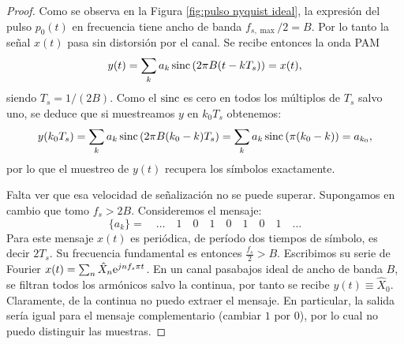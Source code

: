\begin{proof}
Como se observa en la Figura \ref{fig:pulso nyquist ideal}, la expresión del pulso $p_0(t)$ en frecuencia tiene ancho de banda $f_{s,\max}/2 = B$. Por lo tanto la señal $x(t)$ pasa sin distorsión por el canal. Se recibe entonces la onda PAM
\begin{equation*}
  y(t) = \sum_k a_k \operatorname{sinc} \left(2\pi B (t-kT_s)\right) = x(t),
\end{equation*}
siendo $T_s=1/(2B)$.
Como el $\operatorname{sinc}$ es cero en todos los múltiplos de $T_s$ salvo uno, se deduce que si muestreamos $y$ en $k_0 T_s$ obtenemos:
\begin{equation*}
y(k_0 T_s) = \sum_k a_k \operatorname{sinc}\left(2\pi B (k_0-k)T_s\right) = \sum_k a_k \operatorname{sinc}\left(\pi(k_0-k)\right) = a_{k_0},
\end{equation*}
por lo que el muestreo de $y(t)$ recupera los símbolos exactamente.

Falta ver que esa velocidad de señalización no se puede superar. Supongamos en cambio que tomo $f_s > 2B$. Consideremos el mensaje:
\begin{equation*}
\{a_k\} = \quad \ldots \quad 1 \quad 0 \quad 1 \quad 0 \quad 1\quad 0 \quad 1\quad \ldots
\end{equation*}
Para este mensaje $x(t)$ es periódica, de período dos tiempos de símbolo, es decir $2T_s$. Su frecuencia fundamental es entonces $\frac{f_s}{2} > B$. Escribimos su serie de Fourier  $x(t) = \sum_n \hat{X}_n\mathrm{e}^{jnf_s\pi t}$. En un canal pasabajos ideal de ancho de banda $B$, se filtran todos los armónicos salvo la continua, por tanto se recibe $y(t) \equiv \hat{X}_0$. Claramente, de la continua no puedo extraer el mensaje. En particular, la salida sería igual para el mensaje complementario (cambiar $1$ por $0$), por lo cual no puedo distinguir las muestras.
\end{proof}

